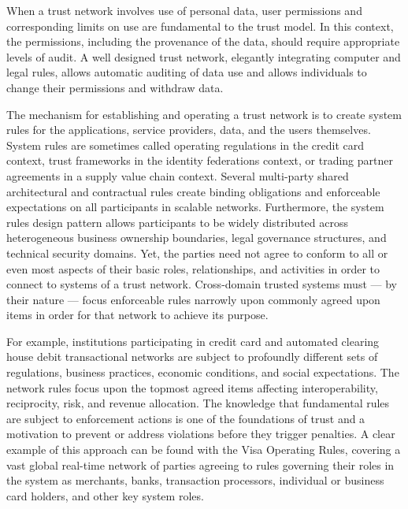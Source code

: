 When a trust network involves use of personal data, user permissions and corresponding limits on use are fundamental to the trust model.
In this context, the permissions, including the provenance of the data, should require appropriate levels of audit.
A well designed trust network, elegantly integrating computer and legal rules, allows automatic auditing of data use and allows individuals to change their permissions and withdraw data.

The mechanism for establishing and operating a trust network is to create system rules for the applications, service providers, data, and the users themselves.
System rules are sometimes called operating regulations in the credit card context, trust frameworks in the identity federations context, or trading partner agreements in a supply value chain context.
Several multi-party shared architectural and contractual rules create binding obligations and enforceable expectations on all participants in scalable networks.
Furthermore, the system rules design pattern allows participants to be widely distributed across heterogeneous business ownership boundaries, legal governance structures, and technical security domains.
Yet, the parties need not agree to conform to all or even most aspects of their basic roles, relationships, and activities in order to connect to systems of a trust network.
Cross-domain trusted systems must --- by their nature --- focus enforceable rules narrowly upon commonly agreed upon items in order for that network to achieve its purpose.

For example, institutions participating in credit card and automated clearing house debit transactional networks are subject to profoundly different sets of regulations, business practices, economic conditions, and social expectations.
The network rules focus upon the topmost agreed items affecting interoperability, reciprocity, risk, and revenue allocation.
The knowledge that fundamental rules are subject to enforcement actions is one of the foundations of trust and a motivation to prevent or address violations before they trigger penalties. 
A clear example of this approach can be found with the Visa Operating Rules, covering a vast global real-time network of parties agreeing to rules governing their roles in the system as merchants, banks, transaction processors, individual or business card holders, and other key system roles.

